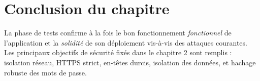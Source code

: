 \section{Conclusion du chapitre}

La phase de tests confirme à la fois le bon fonctionnement
\emph{fonctionnel} de l'application et la \emph{solidité} de son
déploiement vis-à-vis des attaques courantes. Les principaux objectifs
de sécurité fixés dans le chapitre 2 sont remplis : isolation réseau,
HTTPS strict, en-têtes durcis, isolation des données, et hachage
robuste des mots de passe.
